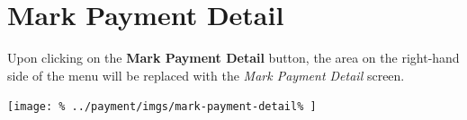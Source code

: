 \documentclass[../main/main]{subfiles}
\begin{document}
\newpage
\section{Mark Payment Detail}
\label{sec:mark-payment-detail}

Upon clicking on the \textbf{Mark Payment Detail} button,
the area on the right-hand side of the menu will be replaced with the
\emph{Mark Payment Detail} screen.

\texttt{[image: \%
  ../payment/imgs/mark-payment-detail\%
]}
\end{document}
